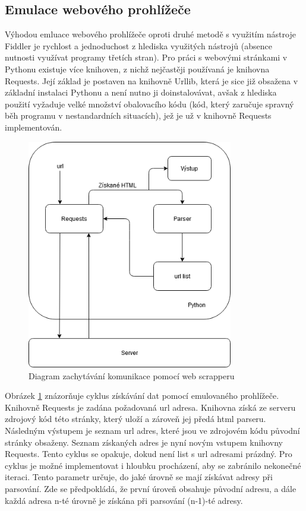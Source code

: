 \documentclass[thesis=M,czech,hidelinks]{FITthesis}[2013/05/06]
\begin{document}
\subsection{Emulace webového prohlížeče} \label{sec:parsing}
Výhodou emluace webového prohlížeče oproti druhé metodě s využitím nástroje Fiddler je rychlost a jednoduchost z hlediska využitých nástrojů (absence nutnosti využívat programy třetích stran). Pro práci s webovými stránkami v Pythonu existuje více knihoven, z nichž nejčastěji používaná je knihovna Requests. Její základ je postaven na knihovně Urllib, která je sice již obsažena v základní instalaci Pythonu a není nutno ji doinstalovávat, avšak z hlediska použití vyžaduje velké množství obalovacího kódu (kód, který zaručuje spravný běh programu v nestandardních situacích), jež je už v knihovně  Requests implementován.

\begin{figure}[h]
	\centering
	\includegraphics[width=9cm]{pictures/scrapper.png}
	\caption{Diagram zachytávání komunikace pomocí web scrapperu}
	\label{fig:web_scrapper}
\end{figure}

Obrázek \ref{fig:web_scrapper} znázorňuje cyklus získávání dat pomocí emulovaného prohlížeče. Knihovně Requests je zadána požadovaná url adresa. Knihovna získá ze serveru zdrojový kód této stránky, který uloží a zároveň jej předá html parseru. Následným výstupem je seznam url adres, které jsou ve zdrojovém kódu původní stránky obsaženy. Seznam získaných adres je nyní novým vstupem knihovny Requests. Tento cyklus se opakuje, dokud není list s url adresami prázdný. Pro cyklus je možné implementovat i hloubku procházení, aby se zabránilo nekonečné iteraci. Tento parametr určuje, do jaké úrovně se mají získávat adresy při parsování. Zde se předpokládá, že první úroveň obsahuje původní adresu, a dále každá adresa n-té úrovně je získána při parsování (n-1)-té adresy.
\end{document}

